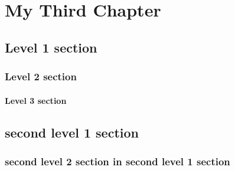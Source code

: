 \chapter{My Third Chapter}	%

\blindtext

\section{Level 1 section}
\blindtext

\subsection{Level 2 section}
\blindtext

\subsubsection{Level 3 section}
\blindtext[3]

\section{second level 1 section}
\blindtext

\subsection{second level 2 section in second level 1 section}
\blindtext

\endinput